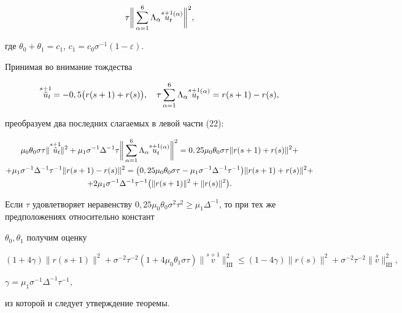 \begin{pf}
\begin{multline}
\tau\bigg\|\sum_{\alpha=1}^6\Lambda_\alpha\ussat\bigg\|^2,


\end{multline}


где $\theta_0+\theta_1=c_1$, $c_1=c_0\sigma^{-1}(1-\varepsilon)$.


Принимая во внимание тождества


$$


\overset{s+1}{\tilde u}_{\!\!\!t}=-0,5\bigl(r(s+1)+r(s)\bigr),\quad


\tau\sum_{\alpha=1}^6\Lambda_\alpha\ussat=r(s+1)-r(s),


$$


преобразуем два последних слагаемых в левой части (22):


\begin{multline*}


\mu_0\theta_0\sigma\tau\|\overset{s+1}{\tilde u}_{\!\!\!t}\|^2+


\mu_1\sigma^{-1}\Delta^{-1}\tau\bigg\|\sum_{\alpha=1}^6\Lambda_\alpha\ussat


\bigg\|^2=0,25\mu_0\theta_0\sigma\tau\|r(s+1)+r(s)\|^2+ \\


%


+\mu_1\sigma^{-1}\Delta^{-1}\tau^{-1}\|r(s+1)-r(s)\|^2=\bigl(0,25\mu_0


\theta_0\sigma\tau-\mu_1\sigma^{-1}\Delta^{-1}\tau^{-1}\bigr)


\|r(s+1)+r(s)\|^2+ \\


%


+2\mu_1\sigma^{-1}\Delta^{-1}\tau^{-1}\bigl(\|r(s+1)\|^2+


\|r(s)\|^2\bigr).


\end{multline*}


Если $\tau$ удовлетворяет неравенству $0,25\mu_0\theta_0\sigma^2\tau^2\geq


\mu_1\Delta^{-1}$, то при тех же предположениях относительно констант


$\theta_0,\theta_1$ получим оценку


$$


(1+4\gamma)\|r(s+1)\|^2+\sigma^{-2}\tau^{-2}(1+4\mu_0\theta_1\sigma\tau)


\|\overset{s+1}{v}\big\|_{\mathrm{III}}^2


\leq(1-4\gamma)\|r(s)\|^2+\sigma^{-2}


\tau^{-2}\|\overset{s}{v}\big\|_{\mathrm{III}}^2,


$$


$\gamma=\mu_1\sigma^{-1}\Delta^{-1}\tau^{-1}$,


из которой и следует утверждение теоремы.


\end{pf}





